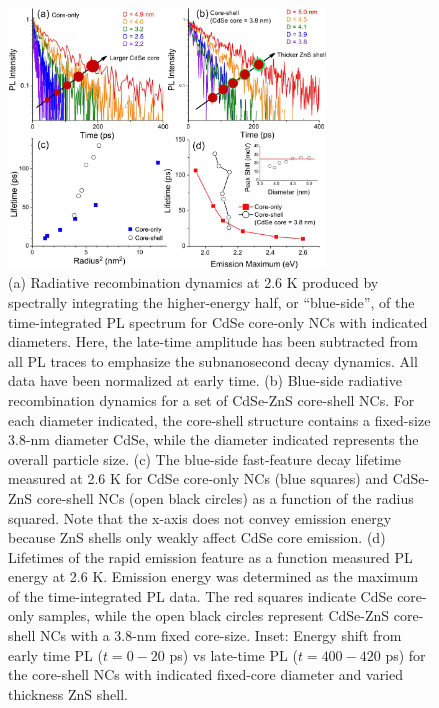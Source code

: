 \begin{figure}
\begin{center}
\includegraphics[width=0.75\textwidth]{./Chapter5/plevel3.jpeg}
\caption[PL decay dynamics as a function of particle size and emission energy for core-only and core-shell CdSe NCs.]{(a) Radiative recombination dynamics at 2.6 K produced by spectrally integrating the higher-energy half, or “blue-side”, of the time-integrated PL spectrum for CdSe core-only NCs with indicated diameters. Here, the late-time amplitude has been subtracted from all PL traces to emphasize the subnanosecond decay dynamics. All data have been normalized at early time. (b) Blue-side radiative recombination dynamics for a set of CdSe-ZnS core-shell NCs. For each diameter indicated, the core-shell structure contains a fixed-size 3.8-nm diameter CdSe, while the diameter indicated represents the overall particle size. (c) The blue-side fast-feature decay lifetime measured at 2.6 K for CdSe core-only NCs (blue squares) and CdSe-ZnS core-shell NCs (open black circles) as a function of the radius squared. Note that the x-axis does not convey emission energy because ZnS shells only weakly affect CdSe core emission. (d) Lifetimes of the rapid emission feature as a function measured PL energy at 2.6 K. Emission energy was determined as the maximum of the time-integrated PL data. The red squares indicate CdSe core-only samples, while the open black circles represent CdSe-ZnS core-shell NCs with a 3.8-nm fixed core-size. Inset: Energy shift from early time PL ($t = 0 - 20$ ps) vs late-time PL ($t = 400 - 420$ ps) for the core-shell NCs with indicated fixed-core diameter and varied thickness ZnS shell.}
\label{f:plevel3}
\end{center}
\end{figure}

